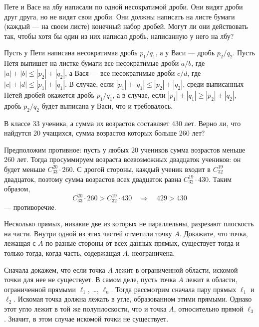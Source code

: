 \resetproblem \begingroup %
    \def\jeolmdate{сентябрь 2022 г.}%
    \def\jeolmgroupname{9}%
    \def\jeolmauthors{Бибиков~П.\,В.}%
\jeolmheader \endgroup


\begin{problems}

\item Пете и Васе на лбу написали по одной несократимой дроби. Они видят дроби друг друга, но не видят свои дроби. Они должны написать на листе бумаги (каждый --- на своем листе) конечный набор дробей. Могут ли они действовать так, чтобы хотя бы один из них написал дробь, написанную у него на лбу?

 Пусть у Пети написана несократимая дробь $p_1/q_1$, а у Васи --- дробь $p_2/q_2$. Пусть Петя выпишет на листке бумаги все несократимые дроби $a/b$, где $|a|+|b|\leq|p_2|+|q_2|$, а Вася --- все несократимые дроби $c/d$, где $|c|+|d|\leq|p_1|+|q_1|$. В случае, если $|p_1|+|q_1|\leq |p_2|+|q_2|$, среди выписанных Петей дробей окажется дробь $p_1/q_1$, а в случае, если $|p_1|+|q_1|\geq |p_2|+|q_2|$, дробь $p_2/q_2$ будет выписана у Васи, что и требовалось.

\item В классе 33 ученика, а сумма их возрастов составляет 430 лет. Верно ли, что найдутся 20 учащихся, сумма возрастов которых больше 260 лет?

 Предположим противное: пусть у любых 20 учеников сумма возрастов меньше 260 лет. Тогда просуммируем возраста всевозможных двадцаток учеников: он будет меньше $C_{33}^{20}\cdot 260$. С дрогой стороны, каждый ученик входит в $C_{32}^{19}$ двадцаток, поэтому сумма возрастов всех двадцаток равна $C_{32}^{19}\cdot 430$. Таким образом, $$C_{33}^{20}\cdot 260>C_{32}^{19}\cdot 430\quad\Longrightarrow\quad 429> 430 $$ --- противоречие.

\item Несколько прямых, никакие две из которых не параллельны, разрезают плоскость на части. Внутри одной из этих частей отметили точку $A$. Докажите, что точка, лежащая с $A$ по разные стороны от всех данных прямых, существует тогда и только тогда, когда часть, содержащая $A$, неограничена.

 Сначала докажем, что если точка $A$ лежит в ограниченной области, искомой точки для нее не существует. В самом деле, пусть точка $A$ лежит в области, ограниченной прямыми $\ell_1$, \ldots, $\ell_n$. Тогда рассмотрим сначала пару прямых $\ell_1$ и $\ell_2$. Искомая точка должна лежать в угле, образованном этими прямыми. Однако этот угло лежит в той же полуплоскости, что и точка $A$, относительно прямой $\ell_3$. Значит, в этом случае искомой точки не существует.


\end{problems}
